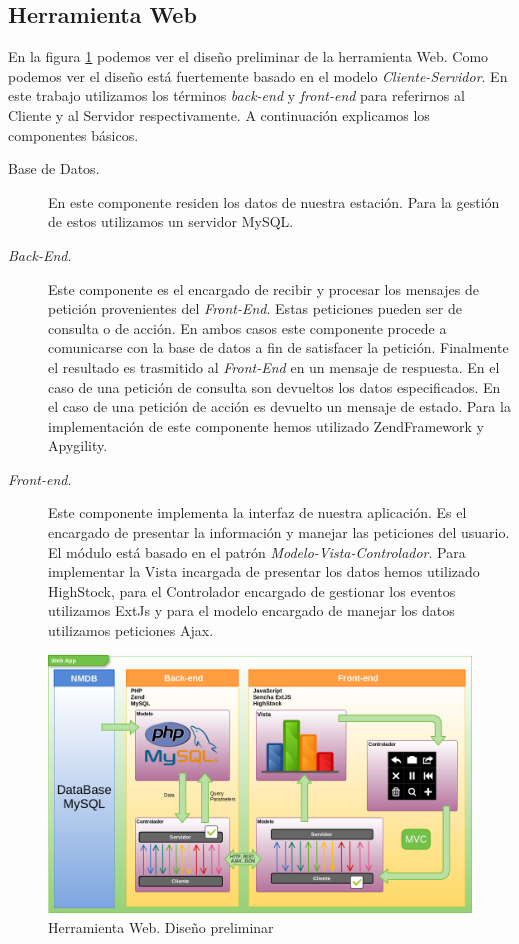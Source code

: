 	\subsection{Herramienta Web}
		En la figura \ref{fig:herramienta_web_preliminar} podemos ver el diseño preliminar de la herramienta Web. Como podemos ver el diseño
		está fuertemente basado en el modelo \emph{Cliente-Servidor}\cite{MVCWiki}. En este trabajo utilizamos los términos \emph{back-end} y
		\emph{front-end} para referirnos al Cliente y al Servidor respectivamente. A continuación explicamos los componentes básicos.
		\begin{description}
			\item[Base de Datos.]    
				En este componente residen los datos de nuestra estación. Para la gestión de estos utilizamos un servidor
				MySQL\cite{MySql}.
			\item[\emph{Back-End}.]
				Este componente es el encargado de recibir y procesar los mensajes de petición provenientes del \emph{Front-End}.
				Estas peticiones pueden ser de consulta o de acción. En ambos casos este componente procede a comunicarse con la base
				de datos a fin de satisfacer la petición. Finalmente el resultado es trasmitido al \emph{Front-End} en un mensaje de
				respuesta. En el caso de una petición de consulta son devueltos los datos especificados. En el caso de una petición de
				acción es devuelto un mensaje de estado. Para la implementación de este componente hemos utilizado
				ZendFramework\cite{ZF} y Apygility\cite{Apigility}.
			\item[\emph{Front-end}.] 
				Este componente implementa la interfaz de nuestra aplicación. Es el encargado de presentar la información y manejar
				las peticiones del usuario. El módulo está basado en el patrón \emph{Modelo-Vista-Controlador}. Para implementar la
				Vista incargada de presentar los datos hemos utilizado HighStock\cite{HighStock}, para el Controlador encargado de
				gestionar los eventos utilizamos ExtJs\cite{ExtJs} y para el modelo encargado de manejar los datos utilizamos
				peticiones Ajax\cite{AjaxWiki}.
		\end{description}
		\begin{figure}[h]
			\centering
			\includegraphics[keepaspectratio, width=1\textwidth]{./img/herramienta_web_preliminar.png}
			\caption{Herramienta Web. Diseño preliminar}
			\label{fig:herramienta_web_preliminar}
		\end{figure}
